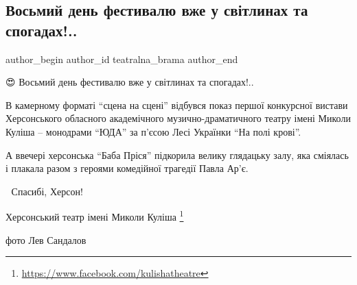  
 
 
 
 

\subsection{Восьмий день фестивалю вже у світлинах та спогадах!..}
\label{sec:19_09_2021.fb.teatralna_brama.1.vosmyj_den_festivalu_svitlyny_spogady}

\ifcmt
 author_begin
   author_id teatralna_brama
 author_end
\fi

😍 Восьмий день фестивалю вже у світлинах та спогадах!..

В камерному форматі \enquote{сцена на сцені} відбувся показ першої конкурсної вистави
Херсонського обласного академічного музично-драматичного театру імені Миколи
Куліша – монодрами \enquote{ЮДА} за п'єсою Лесі Українки \enquote{На полі крові}. 

А ввечері херсонська \enquote{Баба Пріся} підкорила велику глядацьку залу, яка
сміялась і плакала разом з героями комедійної трагедії Павла Ар'є.

💞 Спасибі, Херсон!👏🙌👋

Херсонський театр імені Миколи Куліша%
\footnote{\url{https://www.facebook.com/kulishatheatre}}

фото Лев Сандалов
